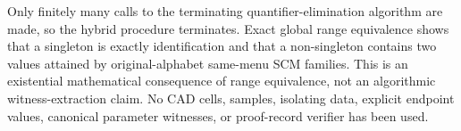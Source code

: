Only finitely many calls to the terminating quantifier-elimination algorithm are made, so the hybrid procedure terminates.  Exact global range equivalence shows that a singleton is exactly identification and that a non-singleton contains two values attained by original-alphabet same-menu SCM families.  This is an existential mathematical consequence of range equivalence, not an algorithmic witness-extraction claim.  No CAD cells, samples, isolating data, explicit endpoint values, canonical parameter witnesses, or proof-record verifier has been used.